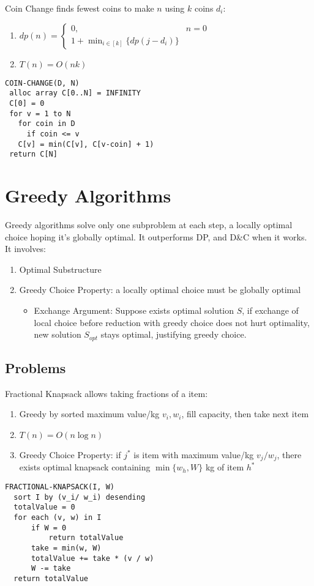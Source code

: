 \documentclass[12pt, a4paper]{article}
\begin{document}
\begin{multicols*}{3}
Coin Change finds fewest coins to make $n$ using $k$ coins $d_i$:
\begin{enumerate}[\roman*.]
  \item $dp(n)=\begin{cases}
        0, &n=0\\
        1 + \min_{i\in[k]}\{dp(j-d_i)\}
      \end{cases}$
  \item $T(n) = O(nk)$
\end{enumerate}
\begin{lstlisting}
COIN-CHANGE(D, N) 
 alloc array C[0..N] = INFINITY
 C[0] = 0
 for v = 1 to N
   for coin in D
     if coin <= v
   C[v] = min(C[v], C[v-coin] + 1)
 return C[N]
\end{lstlisting}

\colbreak


\section{Greedy Algorithms} %
Greedy algorithms solve only one subproblem at each step, a locally optimal choice hoping it's globally optimal. It outperforms DP, and D\&C when it works. It involves:
\begin{enumerate}[\roman*.]
  \item Optimal Substructure
  \item Greedy Choice Property: a locally optimal choice must be globally optimal
    \begin{itemize}[leftmargin=*]\vspace{3pt}
      \item Exchange Argument: Suppose exists optimal solution $S$, if exchange of local choice before reduction with greedy choice does not hurt optimality, new solution $S_{opt}$ stays optimal, justifying greedy choice.
    \end{itemize}
\end{enumerate}

\subsection{Problems}

Fractional Knapsack allows taking fractions of a item:
\begin{enumerate}[\roman*.]
  \item Greedy by sorted maximum value/kg $v_i, w_i$, fill capacity, then take next item
  \item $T(n) = O(n \log n)$
  \item Greedy Choice Property: if $j^*$ is item with maximum value/kg $v_j /w_j$, there exists optimal knapsack containing $\min\{w_h, W\}$ kg of item $h^*$
\end{enumerate}
\begin{lstlisting}
FRACTIONAL-KNAPSACK(I, W)
  sort I by (v_i/ w_i) desending
  totalValue = 0
  for each (v, w) in I
      if W = 0
          return totalValue
      take = min(w, W)          
      totalValue += take * (v / w)
      W -= take
  return totalValue
\end{lstlisting}


\end{multicols*}
\end{document}
